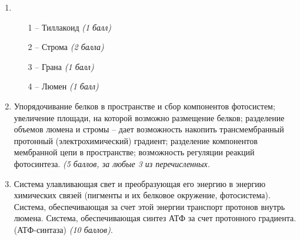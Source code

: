 \solutionSection
\begin{enumerate}
\item
\begin{enumerate}
\item [1 –] Тиллакоид \textit{(1 балл)}
\item [2 –] Строма \textit{(2 балла)}
\item [3 –] Грана \textit{(1 балл)}
\item [4 –] Люмен \textit{(1 балл)}
\end{enumerate}
\item Упорядочивание белков в пространстве и сбор компонентов фотосистем; увеличение площади, на которой возможно размещение белков;  разделение объемов люмена и стромы – дает возможность накопить трансмембранный протонный (электрохимический) градиент; разделение  компонентов мембранной цепи в пространстве;  возможность регуляции реакций фотосинтеза. \textit{(5 баллов, за любые 3 из перечисленных.}
\item Система улавливающая свет и преобразующая его энергию в энергию химических связей (пигменты и их белковое окружение, фотосистема).
Система, обеспечивающая за счет этой энергии транспорт протонов внутрь люмена.
Система, обеспечивающая синтез АТФ за счет протонного градиента. (АТФ-синтаза) \textit{(10 баллов)}.
\end{enumerate}